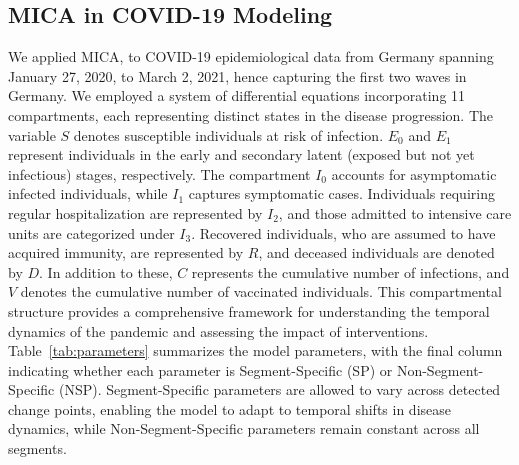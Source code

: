 \documentclass[10pt,letterpaper]{article}
\providecommand{\DIFaddbegin}{} %
\providecommand{\DIFaddend}{} %
\providecommand{\DIFaddincludegraphics}[2][]{{\color{blue}\fbox{\DIFOincludegraphics[#1]{#2}}}} %
\DeclareRobustCommand{\DIFaddbegin}{\DIFOaddbegin \let\includegraphics\DIFaddincludegraphics} %
\DeclareRobustCommand{\DIFaddend}{\DIFOaddend \let\includegraphics\DIFOincludegraphics} %
\begin{document}
\DIFaddend \subsection*{MICA in COVID-19 Modeling}

We applied MICA, to COVID-19 epidemiological data from Germany spanning January 27, 2020, to March 2, 2021, hence capturing the first two waves in Germany. We employed a system of differential equations incorporating 11 compartments, each representing distinct states in the disease progression.
The variable $S$ denotes susceptible individuals at risk of infection. $E_0$ and $E_1$ represent individuals in the early and secondary latent (exposed but not yet infectious) stages, respectively. The compartment $I_0$ accounts for asymptomatic infected individuals, while $I_1$ captures symptomatic cases. Individuals requiring regular hospitalization are represented by $I_2$, and those admitted to intensive care units are categorized under $I_3$. Recovered individuals, who are assumed to have acquired immunity, are represented by $R$, and deceased individuals are denoted by $D$. In addition to these, $C$ represents the cumulative number of infections, and $V$ denotes the cumulative number of vaccinated individuals.
This compartmental structure provides a comprehensive framework for understanding the temporal dynamics of the pandemic and assessing the impact of interventions. Table~\ref{tab:parameters} summarizes the model parameters, with the final column indicating whether each parameter is Segment-Specific (SP) or Non-Segment-Specific (NSP). Segment-Specific parameters are allowed to vary across detected change points, enabling the model to adapt to temporal shifts in disease dynamics, while Non-Segment-Specific parameters remain constant across all segments.

\DIFaddbegin \clearpage
\end{document}

